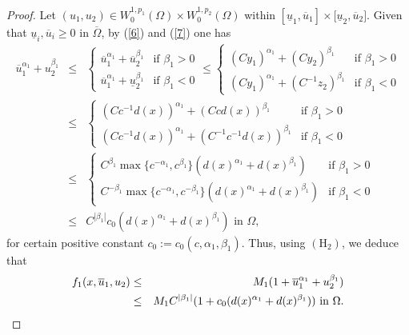 \documentclass[11pt]{amsart}
\theoremstyle{definition}
\theoremstyle{remark}
\numberwithin{equation}{section}
\begin{document}
\begin{proof}
Let $(u_{1},u_{2})\in W_{0}^{1,p_{1}}(\Omega )\times W_{0}^{1,p_{2}}(\Omega
) $ within $[\underline{u}_{1},\overline{u}_{1}]\times \lbrack \underline{u}%
_{2},\overline{u}_{2}]$. Given that $\underline{u}_{i},\overline{u}_{i}\geq
0 $ in $\overline{\Omega }$, by (\ref{6}) and (\ref{7}) one has 
\begin{eqnarray*}
\overline{u}_{1}^{\alpha _{1}}+u_{2}^{\beta _{1}} &\leq &\left\{ 
\begin{array}{ll}
\overline{u}_{1}^{\alpha _{1}}+\overline{u}_{2}^{\beta _{1}} & \text{if }%
\beta _{1}>0 \\ 
\overline{u}_{1}^{\alpha _{1}}+\underline{u}_{2}^{\beta _{1}} & \text{if }%
\beta _{1}<0%
\end{array}%
\right. \leq \left\{ 
\begin{array}{ll}
(Cy_{1})^{\alpha _{1}}+(Cy_{2})^{\beta _{1}} & \text{if }\beta _{1}>0 \\ 
(Cy_{1})^{\alpha _{1}}+(C^{-1}z_{2})^{\beta _{1}} & \text{if }\beta _{1}<0%
\end{array}%
\right. \\
&\leq &\left\{ 
\begin{array}{ll}
(Cc^{-1}d(x))^{\alpha _{1}}+(Ccd(x))^{\beta _{1}} & \text{if }\beta _{1}>0
\\ 
(Cc^{-1}d(x))^{\alpha _{1}}+(C^{-1}c^{-1}d(x))^{\beta _{1}} & \text{if }%
\beta _{1}<0%
\end{array}%
\right. \\
&\leq &\left\{ 
\begin{array}{ll}
C^{\beta _{1}}\max \{c^{-\alpha _{1}},c^{\beta _{1}}\}(d(x)^{\alpha
_{1}}+d(x)^{\beta _{1}}) & \text{if }\beta _{1}>0 \\ 
C^{-\beta _{1}}\max \{c^{-\alpha _{1}},c^{-\beta _{1}}\}(d(x)^{\alpha
_{1}}+d(x)^{\beta _{1}}) & \text{if }\beta _{1}<0%
\end{array}%
\right. \\
&\leq &C^{|\beta _{1}|}c_{0}(d(x)^{\alpha _{1}}+d(x)^{\beta _{1}})\text{ in }%
\Omega ,
\end{eqnarray*}%
for certain positive constant $c_{0}:=c_{0}(c,\alpha _{1},\beta _{1})$.
Thus, using $(\mathrm{H}_{2})$, we deduce that 
\begin{eqnarray}
f_{1}(x,\overline{u}_{1},u_{2}) &\leq &M_{1}(1+\overline{u}_{1}^{\alpha
_{1}}+u_{2}^{\beta _{1}})  \label{11} \\
&\leq &M_{1}C^{|\beta _{1}|}(1+c_{0}(d(x)^{\alpha _{1}}+d(x)^{\beta _{1}}))%
\text{ in }\Omega .  \notag

\end{eqnarray}
\end{proof}
\end{document}
